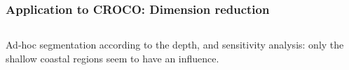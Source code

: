 \documentclass[10pt,aspectratio=169]{beamer}
\newcommand\manupath{/home/victor/acadwriting/Manuscrit/Text/}
\begin{document}
\begin{frame}
  \frametitle{Application to CROCO: Dimension reduction}
  \begin{center}
    \renewcommand\rmfamily{\sffamily}
    \begin{columns}
      \begin{column}{.5\textwidth}
      \end{column}
      \begin{column}{.5\textwidth}
        \resizebox{\textwidth}{!}{}
      \end{column}
    \end{columns}
  \end{center}
  Ad-hoc segmentation according to the depth, and sensitivity
  analysis: only the shallow coastal regions seem to have an
  influence.
\end{frame}
\end{document}
